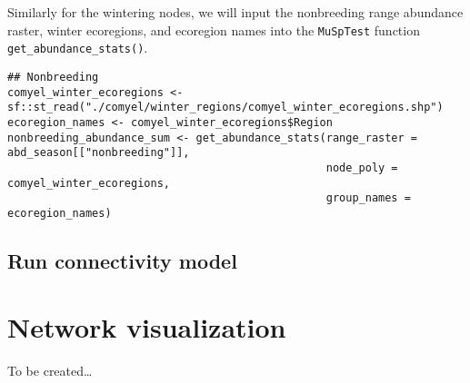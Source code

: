 \documentclass[
]{book}
\begin{document}
Similarly for the wintering nodes, we will input the nonbreeding range abundance raster, winter ecoregions, and ecoregion names into the \texttt{MuSpTest} function \texttt{get\_abundance\_stats()}.

\begin{verbatim}
## Nonbreeding
comyel_winter_ecoregions <- sf::st_read("./comyel/winter_regions/comyel_winter_ecoregions.shp")
ecoregion_names <- comyel_winter_ecoregions$Region
nonbreeding_abundance_sum <- get_abundance_stats(range_raster = abd_season[["nonbreeding"]],
                                                 node_poly = comyel_winter_ecoregions,
                                                 group_names = ecoregion_names)
\end{verbatim}

\hypertarget{run-connectivity-model}{%
\section{Run connectivity model}\label{run-connectivity-model}}

\hypertarget{network-visualization}{%
\chapter{Network visualization}\label{network-visualization}}

To be created\ldots{}

  
\end{document}
